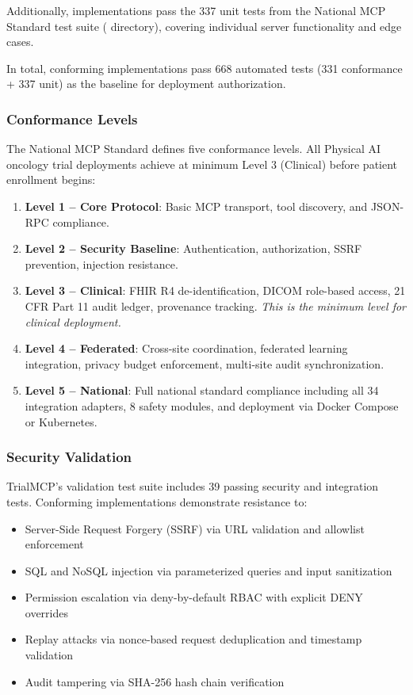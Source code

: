 \documentclass[11pt,letterpaper]{article}
\begin{document}
Additionally, implementations \SHALL{} pass the 337 unit tests from the National MCP Standard test suite ( directory), covering individual server functionality and edge cases.

In total, conforming implementations \SHALL{} pass 668 automated tests (331 conformance + 337 unit) as the baseline for deployment authorization.

\subsubsection{Conformance Levels}

The National MCP Standard defines five conformance levels. All Physical AI oncology trial deployments \SHALL{} achieve at minimum Level 3 (Clinical) before patient enrollment begins:

\begin{enumerate}
  \item \textbf{Level 1 -- Core Protocol}: Basic MCP transport, tool discovery, and JSON-RPC compliance.
  \item \textbf{Level 2 -- Security Baseline}: Authentication, authorization, SSRF prevention, injection resistance.
  \item \textbf{Level 3 -- Clinical}: FHIR R4 de-identification, DICOM role-based access, 21 CFR Part 11 audit ledger, provenance tracking. \textit{This is the minimum level for clinical deployment.}
  \item \textbf{Level 4 -- Federated}: Cross-site coordination, federated learning integration, privacy budget enforcement, multi-site audit synchronization.
  \item \textbf{Level 5 -- National}: Full national standard compliance including all 34 integration adapters, 8 safety modules, and deployment via Docker Compose or Kubernetes.
\end{enumerate}

\subsubsection{Security Validation}

TrialMCP's validation test suite \cite{kawchak2026mcp} includes 39 passing security and integration tests. Conforming implementations \SHALL{} demonstrate resistance to:

\begin{itemize}
  \item Server-Side Request Forgery (SSRF) via URL validation and allowlist enforcement
  \item SQL and NoSQL injection via parameterized queries and input sanitization
  \item Permission escalation via deny-by-default RBAC with explicit DENY overrides
  \item Replay attacks via nonce-based request deduplication and timestamp validation
  \item Audit tampering via SHA-256 hash chain verification
\end{itemize}
\end{document}
